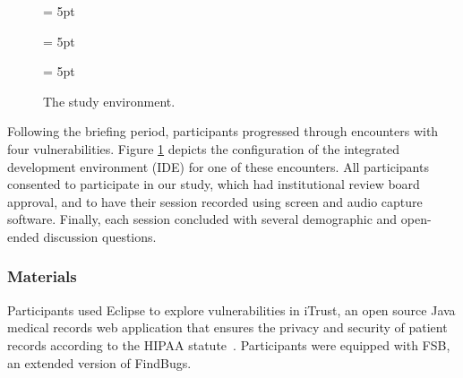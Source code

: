\documentclass[10pt,journal,compsoc]{IEEEtran}
\begin{document}
\begin{figure}
	\subfigcapskip = 5pt
	
	\subfigcapskip = 5pt
	
	\subfigcapskip = 5pt
	
	
	\caption{The study environment.}
	\label{fig:environment} 
\end{figure}

Following the briefing period, participants progressed through encounters with four vulnerabilities. 
Figure \ref{fig:environment} depicts the configuration of the integrated development environment (IDE) for one of these encounters.
All participants consented to participate in our study, which had institutional review board approval, and to have their session recorded using screen and audio capture software.
Finally, each session concluded with several demographic and open-ended discussion questions.



\subsubsection{Materials}
Participants used Eclipse to explore vulnerabilities in iTrust, an open source Java medical records web application that ensures the privacy and security of patient records according to the HIPAA statute~\cite{HIPAA}. 
Participants were equipped with FSB, an extended version of FindBugs.
\end{document}
